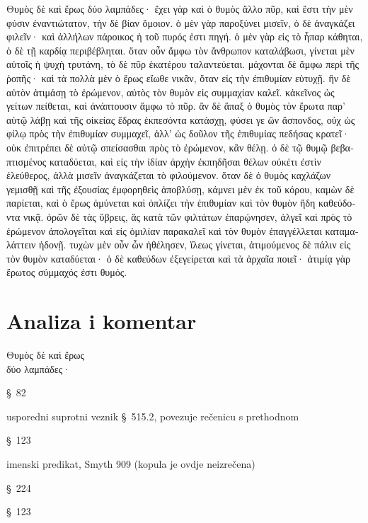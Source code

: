 {\large
{ 
\begin{greek}

\noindent Θυμὸς δὲ καὶ ἔρως δύο λαμπάδες· ἔχει γὰρ καὶ ὁ θυμὸς ἄλλο πῦρ, καὶ ἔστι τὴν μὲν φύσιν ἐναντιώτατον, τὴν δὲ βίαν ὅμοιον. ὁ μὲν γὰρ παροξύνει μισεῖν, ὁ δὲ ἀναγκάζει φιλεῖν· καὶ ἀλλήλων πάροικος ἡ τοῦ πυρός ἐστι πηγή. ὁ μὲν γὰρ εἰς τὸ ἧπαρ κάθηται, ὁ δὲ τῇ καρδίᾳ περιβέβληται.  ὅταν οὖν ἄμφω τὸν ἄνθρωπον καταλάβωσι, γίνεται μὲν αὐτοῖς ἡ ψυχὴ τρυτάνη, τὸ δὲ πῦρ ἑκατέρου ταλαντεύεται. μάχονται δὲ ἄμφω περὶ τῆς ῥοπῆς· καὶ τὰ πολλὰ μὲν ὁ ἔρως εἴωθε νικᾶν, ὅταν εἰς τὴν ἐπιθυμίαν εὐτυχῇ. ἢν δὲ αὐτὸν ἀτιμάσῃ τὸ ἐρώμενον, αὐτὸς τὸν θυμὸν εἰς συμμαχίαν καλεῖ.  κἀκεῖνος ὡς γείτων πείθεται, καὶ ἀνάπτουσιν ἄμφω τὸ πῦρ. ἂν δὲ ἅπαξ ὁ θυμὸς τὸν ἔρωτα παρ' αὑτῷ λάβῃ καὶ τῆς οἰκείας ἕδρας ἐκπεσόντα κατάσχῃ, φύσει γε ὢν ἄσπονδος, οὐχ ὡς φίλῳ πρὸς τὴν ἐπιθυμίαν συμμαχεῖ, ἀλλ' ὡς δοῦλον τῆς ἐπιθυμίας πεδήσας κρατεῖ· οὐκ ἐπιτρέπει δὲ αὐτῷ σπείσασθαι πρὸς τὸ ἐρώμενον, κἂν θέλῃ.  ὁ δὲ τῷ θυμῷ βεβαπτισμένος καταδύεται, καὶ εἰς τὴν ἰδίαν ἀρχὴν ἐκπηδῆσαι θέλων οὐκέτι ἐστὶν ἐλεύθερος, ἀλλὰ μισεῖν ἀναγκάζεται τὸ φιλούμενον. ὅταν δὲ ὁ θυμὸς καχλάζων γεμισθῇ καὶ τῆς ἐξουσίας ἐμφορηθεὶς ἀποβλύσῃ, κάμνει μὲν ἐκ τοῦ κόρου, καμὼν δὲ παρίεται, καὶ ὁ ἔρως ἀμύνεται καὶ ὁπλίζει τὴν ἐπιθυμίαν καὶ τὸν θυμὸν ἤδη καθεύδοντα νικᾷ. ὁρῶν δὲ τὰς ὕβρεις, ἃς κατὰ τῶν φιλτάτων ἐπαρῴνησεν, ἀλγεῖ καὶ πρὸς τὸ ἐρώμενον ἀπολογεῖται καὶ εἰς ὁμιλίαν παρακαλεῖ καὶ τὸν θυμὸν ἐπαγγέλλεται καταμαλάττειν ἡδονῇ.  τυχὼν μὲν οὖν ὧν ἠθέλησεν, ἵλεως γίνεται, ἀτιμούμενος δὲ πάλιν εἰς τὸν θυμὸν καταδύεται· ὁ δὲ καθεύδων ἐξεγείρεται καὶ τὰ ἀρχαῖα ποιεῖ· ἀτιμίᾳ γὰρ ἔρωτος σύμμαχός ἐστι θυμός.

\end{greek}
}
}

\vfill

\newpage

\section*{Analiza i komentar}


{\large
\begin{greek}
\noindent Θυμὸς δὲ καὶ ἔρως \\
δύο λαμπάδες·\\

\end{greek}
}

\begin{description}[noitemsep]
\item[Θυμὸς ] §~82
\item[δὲ] usporedni suprotni veznik §~515.2, povezuje rečenicu s prethodnom
\item[ἔρως] §~123
\item[δύο λαμπάδες] imenski predikat, Smyth 909 (kopula je ovdje neizrečena)
\item[δύο] §~224
\item[λαμπάδες] §~123
\end{description}

